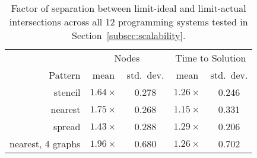 \begin{table}[t]
\centering
\small
\begin{tabular}{r | c | c | c | c}
        & \multicolumn{2}{|c|}{Nodes} & \multicolumn{2}{|c}{Time to Solution} \\
Pattern & mean & std.~dev. & mean & std.~dev. \\
\hline
stencil & $1.64\times$ & 0.278 & $1.26\times$ & 0.246 \\
nearest & $1.75\times$ & 0.268 & $1.15\times$ & 0.331 \\
spread  & $1.43\times$ & 0.288 & $1.29\times$ & 0.206 \\
nearest, 4 graphs & $1.96\times$ & 0.680 & $1.26\times$ & 0.702
\end{tabular}

\vspace{-0.20cm}
\caption{Factor of separation between limit-ideal and limit-actual intersections across all 12 programming systems tested in Section~\ref{subsec:scalability}.\label{tab:metg-predict-strong}}
\vspace{-0.5cm}
\end{table}
